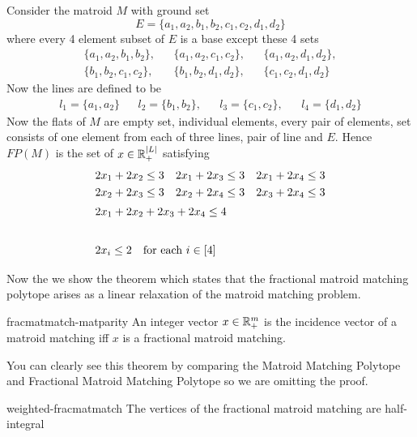 \begin{example}{}{}
	Consider the matroid $M$ with ground set $$E=\{a_1,a_2,b_1,b_2,c_1,c_2,d_1,d_2\}$$where every 4 element subset of $E$ is a base except these 4 sets \begin{align*}
		\{a_1,a_2,b_1,b_2\}, &  & \{a_1,a_2,c_1,c_2\}, &  & \{a_1,a_2,d_1,d_2\}, \\
		\{b_1,b_2,c_1,c_2\}, &  & \{b_1,b_2,d_1,d_2\}, &  & \{c_1,c_2,d_1,d_2\}
	\end{align*}Now the lines are  defined to be \begin{align*}
		l_1=\{a_1,a_2\} &  & l_2=\{b_1,b_2\}, &  & l_3=\{c_1,c_2\}, &  & l_4=\{d_1,d_2\}
	\end{align*} Now the flats of $M$ are empty set, individual elements, every pair of elements, set consists of one element from each of three lines, pair of line and $E$. Hence $FP(M)$ is the set of $x\in\mathbb{R}^{|L|}_+$ satisfying \begin{align*}
		2x_1+2x_2\leq 3 &  & 2x_1+2x_3\leq 3 &  & 2x_1+2x_4\leq 3 \\
		2x_2+2x_3\leq 3 &  & 2x_2+2x_4\leq 3 &  & 2x_3+2x_4\leq 3 \\
		\shortintertext{\centering $2x_1+2x_2+2x_3+2x_4\leq 4$}   \\
		\shortintertext{\centering $2x_i\leq 2\quad \text{for each $i\in[4]$}$}
	\end{align*}
\end{example}
Now the we show the theorem  which states that the fractional matroid matching polytope arises
as a linear relaxation of the matroid matching problem.
\begin{Theorem}{\cite[Theoerm 2.1]{VandeVate_1992_Fmm}}{fracmatmatch-matparity}
	An integer vector $x\in\mathbb{R}^{m}_+$ is the incidence  vector of a matroid matching iff $x$ is a fractional matroid matching.
\end{Theorem}
You can clearly see this theorem by comparing the Matroid Matching Polytope and Fractional Matroid Matching Polytope so we are omitting the proof.
\begin{Theorem}{\cite[Theorem 1]{GijswijtPap_2013_Aaf}}{weighted-fracmatmatch}
	The vertices of the fractional matroid matching are half-integral
\end{Theorem}
